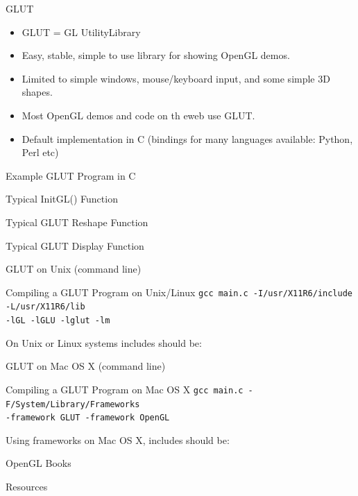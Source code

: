 \documentclass[xcolor=dvipsnames,t]{beamer}
\newcommand{\showcode}[1]{\begin{mdframed}[style=code] %
                          \end{mdframed}%
}
\begin{document}
\begin{frame}{GLUT} 
    \begin{itemize} 
        \item GLUT = GL UtilityLibrary
        \item Easy, stable, simple to use library for showing OpenGL demos.
        \item Limited to simple windows, mouse/keyboard input, and some simple 3D shapes.
        \item Most OpenGL demos and code on th eweb use GLUT.
        \item Default implementation in C
             (bindings for many languages available: Python, Perl etc)
    \end{itemize} 
\end{frame} 

\begin{frame}{Example GLUT Program in C} 
    \showcode{glutmain.c} 
\end{frame} 

\begin{frame}{Typical InitGL() Function} 
    \showcode{initgl.c} 
\end{frame} 

\begin{frame}{Typical GLUT Reshape Function} 
    \showcode{reshape.c} 
\end{frame} 

\begin{frame}{Typical GLUT Display Function} 
    \showcode{display.c} 
\end{frame} 

\begin{frame}{GLUT on Unix (command line)}
    \begin{block}{Compiling a GLUT Program on Unix/Linux}
    \small
    \texttt{gcc main.c -I/usr/X11R6/include -L/usr/X11R6/lib \\ -lGL -lGLU -lglut -lm}
   \normalsize
   \end{block} 

    On Unix or Linux systems includes should be:
    \showcode{unixincludes.c} 
\end{frame} 

\begin{frame}{GLUT on Mac OS X (command line) } 
    \begin{block}{Compiling a GLUT Program on Mac OS X} 
    \small
    \texttt{gcc main.c -F/System/Library/Frameworks  \\ -framework GLUT -framework OpenGL}
    \normalsize
    \end{block} 

    Using frameworks on Mac OS X, includes should be:
    \showcode{macincludes.c} 
\end{frame} 


\begin{frame}{OpenGL Books} 
\end{frame} 

\begin{frame}{Resources} 
\end{frame} 
\end{document}
